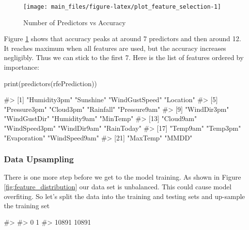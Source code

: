 \begin{Schunk}
\begin{figure}[H]

{\centering \texttt{[image: main\_files/figure-latex/plot\_feature\_selection-1]} 

}

\caption[Number of Predictors vs Accuracy]{Number of Predictors vs Accuracy}\label{fig:plot_feature_selection}
\end{figure}
\end{Schunk}

Figure \ref{fig:plot_feature_selection} shows that accuracy peaks at
around 7 predictors and then around 12. It reaches maximum when all
features are used, but the accuracy increases negligibly. Thus we can
stick to the first 7. Here is the list of features ordered by
importance:

\begin{Schunk}
\begin{Sinput}
print(predictors(rfePrediction))
\end{Sinput}
\begin{Soutput}
#>  [1] "Humidity3pm"   "Sunshine"      "WindGustSpeed" "Location"     
#>  [5] "Pressure3pm"   "Cloud3pm"      "Rainfall"      "Pressure9am"  
#>  [9] "WindDir3pm"    "WindGustDir"   "Humidity9am"   "MinTemp"      
#> [13] "Cloud9am"      "WindSpeed3pm"  "WindDir9am"    "RainToday"    
#> [17] "Temp9am"       "Temp3pm"       "Evaporation"   "WindSpeed9am" 
#> [21] "MaxTemp"       "MMDD"
\end{Soutput}
\end{Schunk}

\hypertarget{data-upsampling}{%
\subsubsection{Data Upsampling}\label{data-upsampling}}

There is one more step before we get to the model training. As shown in
Figure \ref{fig:feature_distribution} our data set is unbalanced. This
could cause model overfiting. So let's split the data into the training
and testing sets and up-sample the training set

\begin{Schunk}
\begin{Soutput}
#> 
#>     0     1 
#> 10891 10891
\end{Soutput}
\end{Schunk}

